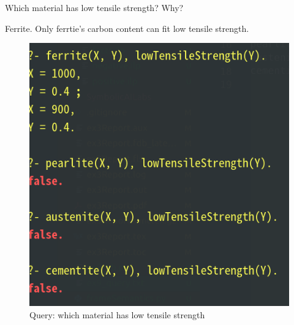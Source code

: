 \documentclass[12pt]{article}
\begin{document}
{\begin{enumerate}[1.]
	Which material has low tensile strength? Why?

	Ferrite. Only ferrtie's carbon content can fit low tensile strength.

	\begin{figure}[ht]
		\centering
		\includegraphics[scale=0.3]{figs/ex9-3-3.png}
		\caption{Query: which material has low tensile strength}
		\label{fig:label15}
	\end{figure}

\end{enumerate}

\newpage
}
\end{document}
